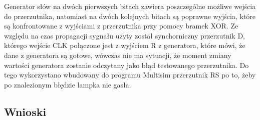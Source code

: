 \documentclass{article}
\begin{document}
Generator słów na dwóch pierwszych bitach zawiera poszczególne możliwe wejścia do przerzutnika, natomiast na dwóch kolejnych
bitach są poprawne wyjścia, które są konfrontowane z wyjściami z przerzutnika przy pomocy bramek XOR. Ze względu na 
czas propagacji sygnału użyty został synchorniczny przerzutnik D, którego wejście CLK połączone jest z wyjściem R z generatora, które
mówi, że dane z generatora są gotowe, wówczas nie ma sytuacji, że moment zmiany wartości generatora zostanie odczytany jako
błąd testowanego przerzutnika. Do tego wykorzystano wbudowany do programu Multisim przerzutnik RS po to, żeby
po znalezionym błędzie lampka nie gasła.

\subsection{Wnioski}
\end{document}
